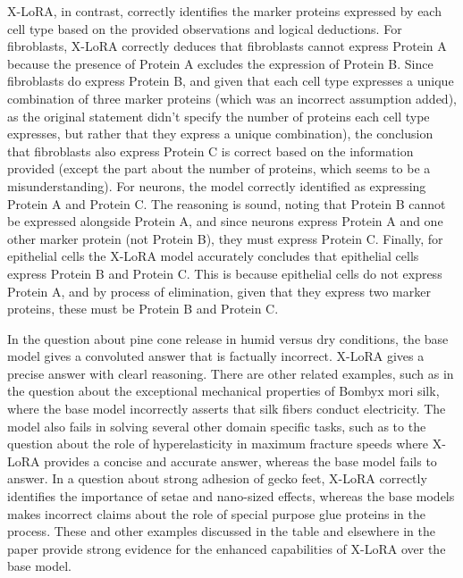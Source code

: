 X-LoRA, in contrast, correctly identifies the marker proteins expressed by each cell type based on the provided observations and logical deductions. For fibroblasts, X-LoRA correctly deduces that fibroblasts cannot express Protein A because the presence of Protein A excludes the expression of Protein B. Since fibroblasts do express Protein B, and given that each cell type expresses a unique combination of three marker proteins (which was an incorrect assumption added), as the original statement didn't specify the number of proteins each cell type expresses, but rather that they express a unique combination), the conclusion that fibroblasts also express Protein C is correct based on the information provided (except the part about the number of proteins, which seems to be a misunderstanding). For neurons, the model correctly identified as expressing Protein A and Protein C. The reasoning is sound, noting that Protein B cannot be expressed alongside Protein A, and since neurons express Protein A and one other marker protein (not Protein B), they must express Protein C. Finally, for epithelial cells the X-LoRA model accurately concludes that epithelial cells express Protein B and Protein C. This is because epithelial cells do not express Protein A, and by process of elimination, given that they express two marker proteins, these must be Protein B and Protein C.

In the question about pine cone release in humid versus dry conditions, the base model gives a convoluted answer that is factually incorrect. X-LoRA gives a precise answer with clearl reasoning. There are other related examples, such as in the question about the exceptional mechanical properties of Bombyx mori silk, where the base model incorrectly asserts that silk fibers conduct electricity. The model also fails in solving several other domain specific tasks, such as to the question about the role of hyperelasticity in maximum fracture speeds where X-LoRA provides a concise and accurate answer, whereas the base model fails to answer. In a question about strong adhesion of gecko feet, X-LoRA correctly identifies the importance of setae and nano-sized effects, whereas the base models makes incorrect claims about the role of special purpose glue proteins in the process. These and other examples discussed in the table and elsewhere in the paper provide strong evidence for the enhanced capabilities of X-LoRA over the base model. 




\begingroup 
\tiny 



